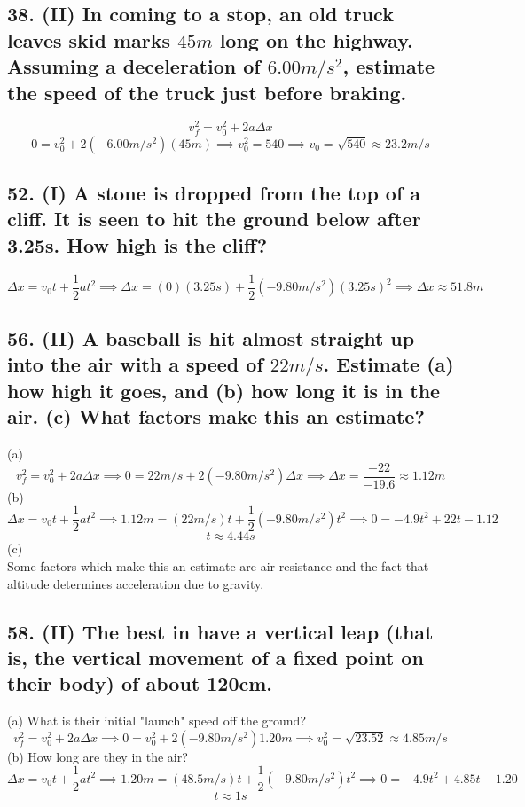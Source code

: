 \documentclass[12pt,a4paper,english]{article}
\begin{document}
\begin{flushleft}
      \subsection{38. (II) In coming to a stop, an old truck leaves skid marks $45m$ long on the highway. Assuming a deceleration of $6.00m/s^2$, estimate the speed of the truck just before braking.}
      \[
        v_f^2=v_0^2+2a\Delta x
      \]
      \[
        0=v_0^2+2(-6.00m/s^2)(45m) \implies
        v_0^2=540 \implies v_0=\sqrt{540}\approx 23.2m/s
        \]
      \subsection{52. (I) A stone is dropped from the top of a cliff. It is seen to hit the ground below after 3.25s. How high is the cliff?}
      \[
        \Delta x=v_{0}t+\frac{1}{2}at^2 \implies 
        \Delta x=(0)(3.25s)+\frac{1}{2}(-9.80m/s^2)(3.25s)^2 \implies 
        \Delta x \approx 51.8m
      \]
      \subsection{56. (II) A baseball is hit almost straight up into the air with a speed of $22m/s$. Estimate (a) how high it goes, and (b) how long it is in the air. (c) What factors make this an estimate?}
      (a)
      \[
        v_{f}^2=v_{0}^2+2a\Delta x \implies
        0=22m/s+2(-9.80m/s^2)\Delta x \implies
        \Delta x = \frac{-22}{-19.6} \approx 1.12m
      \]
      (b)
      \[
        \Delta x=v_{0}t+\frac{1}{2}at^2 \implies
        1.12m=(22m/s)t+\frac{1}{2}(-9.80m/s^2)t^2 \implies
        0=-4.9t^2+22t-1.12
      \]
      \[
        t\approx 4.44s
      \]
      (c)\\
      Some factors which make this an estimate are air resistance and the fact that altitude determines acceleration due to gravity.
      \subsection{58. (II) The best  in  have a vertical leap (that is, the vertical movement of a fixed point on their body) of about 120cm.}
      (a) What is their initial "launch" speed off the ground?
      \[
        v_{f}^2=v_{0}^2+2a\Delta x\implies 
        0=v_0^2+2(-9.80m/s^2)1.20m \implies
        v_0^2=\sqrt{23.52}\approx 4.85m/s
      \]
      (b) How long are they in the air?
      \[
        \Delta x=v_{0}t+\frac{1}{2}at^2 \implies
        1.20m=(48.5m/s)t+\frac{1}{2}(-9.80m/s^2)t^2 \implies
        0=-4.9t^2+4.85t-1.20
    \]
    \[
        t \approx 1s
    \]

\end{flushleft}
\end{document}

